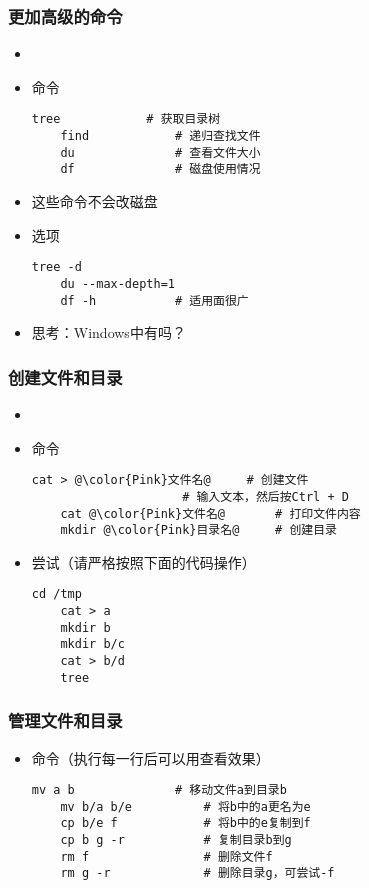 \begin{CJK}{UTF8}{gbsn}
\begin{frame} [fragile]
	\frametitle{更加高级的命令}
	\begin{itemize}
	\item {}
	\item 命令
	\begin{lstlisting}[style=bashstyle, gobble=4, texcl]
	tree			# 获取目录树
	find			# 递归查找文件
	du				# 查看文件大小
	df				# 磁盘使用情况
	\end{lstlisting}
	\item 这些命令不会改磁盘
	\item 选项
	\begin{lstlisting}[style=bashstyle, gobble=4, texcl]
	tree -d
	du --max-depth=1
	df -h			# 适用面很广
	\end{lstlisting}
	\item 思考：Windows中有吗？
	\end{itemize}
\end{frame}

\begin{frame} [fragile]
	\frametitle{创建文件和目录}
	\begin{itemize}
	\item {}
	\item 命令
	\begin{lstlisting}[style=bashstyle, gobble=4, texcl, escapechar=@]
	cat > @\color{Pink}文件名@		# 创建文件
					 # 输入文本，然后按Ctrl + D
	cat @\color{Pink}文件名@		# 打印文件内容
	mkdir @\color{Pink}目录名@		# 创建目录
	\end{lstlisting}
	\item 尝试（请严格按照下面的代码操作）
	\begin{lstlisting}[style=bashstyle, gobble=4, texcl]
	cd /tmp
	cat > a
	mkdir b
	mkdir b/c
	cat > b/d
	tree
	\end{lstlisting}
	\end{itemize}
\end{frame}

\begin{frame} [fragile]
	\frametitle{管理文件和目录}
	\linespread{1.25}
	\begin{itemize}
	\item 命令（执行每一行后可以用查看效果）
	\begin{lstlisting}[style=bashstyle, gobble=4, texcl]
	mv a b				# 移动文件a到目录b
	mv b/a b/e			# 将b中的a更名为e
	cp b/e f			# 将b中的e复制到f
	cp b g -r			# 复制目录b到g
	rm f				# 删除文件f
	rm g -r				# 删除目录g，可尝试-f
	\end{lstlisting}
	\end{itemize}
\end{frame}


\end{CJK}
